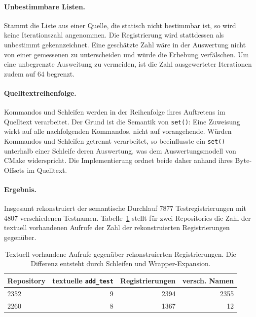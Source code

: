 \documentclass[12pt,a4paper,twoside,headsepline,parskip=half]{scrreprt}
\begin{document}
\paragraph{Unbestimmbare Listen.}
Stammt die Liste aus einer Quelle, die statisch nicht bestimmbar ist, so wird keine
Iterationszahl angenommen. Die Registrierung wird stattdessen als unbestimmt
gekennzeichnet. Eine geschätzte Zahl wäre in der Auswertung nicht von einer
gemessenen zu unterscheiden und würde die Erhebung verfälschen. Um eine unbegrenzte
Ausweitung zu vermeiden, ist die Zahl ausgewerteter Iterationen zudem auf 64 begrenzt.

\paragraph{Quelltextreihenfolge.}
Kommandos und Schleifen werden in der Reihenfolge ihres Auftretens im Quelltext
verarbeitet. Der Grund ist die Semantik von \texttt{set()}: Eine Zuweisung wirkt auf
alle nachfolgenden Kommandos, nicht auf vorangehende. Würden Kommandos und Schleifen
getrennt verarbeitet, so beeinflusste ein \texttt{set()} unterhalb einer Schleife
deren Auswertung, was dem Auswertungsmodell von CMake widerspricht. Die
Implementierung ordnet beide daher anhand ihres Byte-Offsets im Quelltext.

\paragraph{Ergebnis.}
Insgesamt rekonstruiert der semantische Durchlauf 7877 Testregistrierungen mit
4807 verschiedenen Testnamen. Tabelle~\ref{tab:impl-fallbeispiele} stellt für zwei
Repositories die Zahl der textuell vorhandenen Aufrufe der Zahl der rekonstruierten
Registrierungen gegenüber.

\begin{table}[H]
    \centering
    \small
    \begin{tabular}{l r r r}
        \toprule
        \textbf{Repository} & \textbf{textuelle \texttt{add\_test}}
            & \textbf{Registrierungen} & \textbf{versch. Namen} \\
        \midrule
        2352 & 9 & 2394 & 2355 \\
        2260 & 8 & 1367 & 12 \\
        \bottomrule
    \end{tabular}
    \caption{Textuell vorhandene Aufrufe gegenüber rekonstruierten Registrierungen.
    Die Differenz entsteht durch Schleifen und Wrapper-Expansion.}
    \label{tab:impl-fallbeispiele}
\end{table}
\end{document}
